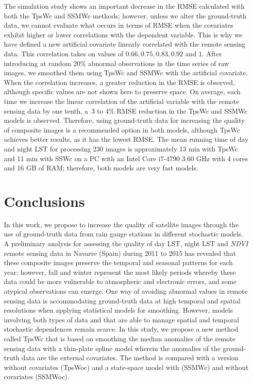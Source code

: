 The simulation study shows an important decrease in the RMSE calculated with both the TpsWc and SSMWc methods; however, unless we alter the ground-truth data, we cannot evaluate what occurs in terms of RMSE when the covariates exhibit higher or lower correlations with the dependent variable. %
This is why we have defined a new artificial covariate linearly correlated with the remote sensing data. This correlation takes on values of $0.66,0.75,0.83,0.92$ and $1$. After introducing at random 20\% abnormal observations in the time series of raw images, we smoothed them using TpsWc and SSMWc with the artificial covariate. When the correlation increases, a greater reduction in the RMSE is observed, although specific values are not shown here to preserve space.
On average, each time we increase the linear correlation of the artificial variable with the remote sensing data by one tenth, a~3 to 4\% RMSE reduction in the TpsWc and SSMWc models is observed. Therefore, using ground-truth data for increasing the quality of composite images is a recommended option in both models, although TpsWc achieves better results, as it has the lowest RMSE.
The mean running time of day and night LST for processing 230 images is approximately 13 min with TpsWc and 11 min with SSWc on a PC with an Intel Core i7-4790 
3.60 GHz with 4 cores and 16 GB of RAM; therefore, both models are very fast models.



\section{Conclusions}
\label{Chap6_sec:conclusions}
In this work, we propose to increase the quality of satellite images through the use of ground-truth data from rain gauge stations in different stochastic models.
A preliminary analysis for assessing the quality of day LST, night LST and \emph{NDVI} remote sensing data in Navarre (Spain) during 2011 to 2015 has revealed that these composite images preserve the temporal and seasonal patterns for each year; however, fall and winter represent the most likely periods whereby these data could be more vulnerable to atmospheric and electronic errors, and some atypical observations can emerge.
One way of avoiding abnormal values in remote sensing data is accommodating ground-truth data at high temporal and
spatial resolutions when applying statistical models for smoothing. However, models involving both types of data and that are able to manage spatial and temporal stochastic dependences remain scarce.
In this study, we propose a new method called TpsWc that is based on smoothing the median anomalies of the remote sensing data with a thin-plate spline model wherein the anomalies of the ground-truth data are the external covariates. The method is compared with a version without covariates (TpsWoc) and a state-space model with (SSMWc) and without covariates (SSMWoc).

